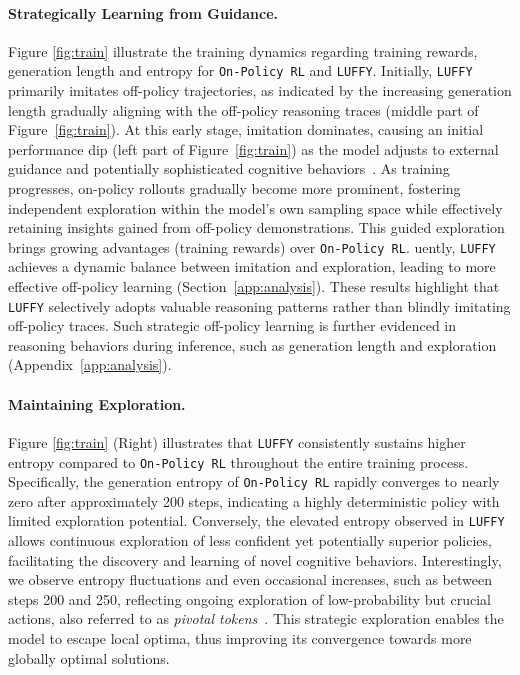 \documentclass{article}
\newcommand{\m}[1]{\texttt{#1}}
\begin{document}
\paragraph{Strategically Learning from Guidance.} 
Figure \ref{fig:train} illustrate the training dynamics regarding training rewards, generation length and entropy for \m{On-Policy RL} and \m{LUFFY}. 
Initially, \m{LUFFY} primarily imitates off-policy trajectories, as indicated by the increasing generation length gradually aligning with the off-policy reasoning traces (middle part of Figure~\ref{fig:train}). 
At this early stage, imitation dominates, causing an initial performance dip (left part of Figure~\ref{fig:train}) as the model adjusts to external guidance and potentially sophisticated cognitive behaviors~\cite{why_distill}. 
As training progresses, on-policy rollouts gradually become more prominent, fostering independent exploration within the model's own sampling space while effectively retaining insights gained from off-policy demonstrations. 
This guided exploration brings growing advantages (training rewards) over \m{On-Policy RL}. 
uently, \m{LUFFY} achieves a dynamic balance between imitation and exploration, leading to more effective off-policy learning (Section~\ref{app:analysis}). 
These results highlight that \m{LUFFY} selectively adopts valuable reasoning patterns rather than blindly imitating off-policy traces. 
Such strategic off-policy learning is further evidenced in reasoning behaviors during inference, such as generation length and exploration (Appendix~\ref{app:analysis}).




\paragraph{Maintaining Exploration.} 
Figure \ref{fig:train} (Right) illustrates that \m{LUFFY} consistently sustains higher entropy compared to \m{On-Policy RL} throughout the entire training process. 
Specifically, the generation entropy of \m{On-Policy RL} rapidly converges to nearly zero after approximately 200 steps, indicating a highly deterministic policy with limited exploration potential. 
Conversely, the elevated entropy observed in \m{LUFFY} allows continuous exploration of less confident yet potentially superior policies, facilitating the discovery and learning of novel cognitive behaviors. 
Interestingly, we observe entropy fluctuations and even occasional increases, such as between steps 200 and 250, reflecting ongoing exploration of low-probability but crucial actions, also referred to as \textit{pivotal tokens}~\cite{abdin2024phi4technicalreport,yu2025dapoopensourcellmreinforcement}. This strategic exploration enables the model to escape local optima, thus improving its convergence towards more globally optimal solutions.
\end{document}
